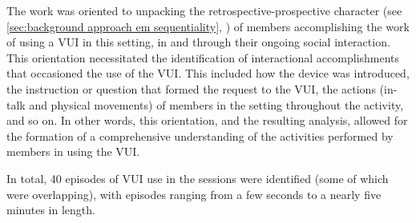 \begin{revisedsubmission}
The work was oriented to unpacking the retrospective-prospective character (see \ref{sec:background approach em sequentiality}, \citet[pp. 35--75]{Garfinkel1967}) of members accomplishing the work of using a \ac{VUI} in this setting, in and through their ongoing social interaction.
This orientation necessitated the identification of interactional accomplishments that occasioned the use of the \ac{VUI}.
This included how the device was introduced, the instruction or question that formed the request to the \ac{VUI}, the actions (in-talk and physical movements) of members in the setting throughout the activity, and so on.
In other words, this orientation, and the resulting analysis, allowed for the formation of a comprehensive understanding of the activities performed by members in using the \ac{VUI}.%
\end{revisedsubmission}

In total, 40 episodes of \ac{VUI} use in the sessions were identified (some of which were overlapping), with episodes ranging from a few seconds to a nearly five minutes in length.







